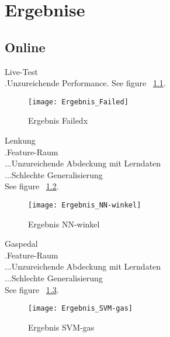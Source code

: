 
\chapter{Ergebnise} %
\label{cha:Ergebnise}

\section{Online} %
\label{sec:Online}
Live-Test\\
.Unzureichende Performance. See figure ~\ref{fig:Ergebnis_Failed}.\\

\begin{figure}[htbp]
\begin{center}
\texttt{[image: Ergebnis\_Failed]}
\caption{Ergebnis Failedx}
\label{fig:Ergebnis_Failed}
\end{center}
\end{figure} 

Lenkung\\
.Feature-Raum\\
...Unzureichende Abdeckung mit Lerndaten\\
...Schlechte Generalisierung\\
See figure ~\ref{fig:Ergebnis_NN-winkel}.\\

\begin{figure}[htbp]
\begin{center}
\texttt{[image: Ergebnis\_NN-winkel]}
\caption{Ergebnis NN-winkel}
\label{fig:Ergebnis_NN-winkel}
\end{center}
\end{figure}

Gaspedal\\
.Feature-Raum\\
...Unzureichende Abdeckung mit Lerndaten\\
...Schlechte Generalisierung\\
See figure ~\ref{fig:Ergebnis_SVM-gas}.\\

\begin{figure}[htbp]
\begin{center}
\texttt{[image: Ergebnis\_SVM-gas]}
\caption{Ergebnis SVM-gas}
\label{fig:Ergebnis_SVM-gas}
\end{center}
\end{figure}


